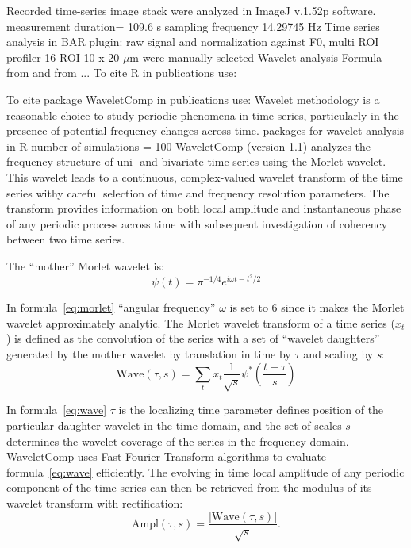 \documentclass{biophys-new}
\begin{document}
Recorded time-series image stack were analyzed in ImageJ v.1.52p software\cite{rueden2017imagej2}.
measurement duration= 109.6 s sampling frequency 14.29745 Hz
Time series analysis in BAR plugin: raw signal and
normalization against F0, multi ROI profiler
16 ROI 10 x 20 $\mu$m were manually selected
Wavelet analysis
Formula from \cite{grinsted2004application} and from \cite{kahraman2016multiple} ...
To cite R in publications use:  \cite{team2014r}

To cite package WaveletComp in publications use: \cite{rosch2016waveletcomp}
Wavelet methodology is a reasonable choice to study periodic phenomena in time series, particularly in
the presence of potential frequency changes across time.
packages for wavelet analysis in R
number of simulations = 100
WaveletComp (version 1.1) analyzes the frequency structure of uni- and bivariate time series using the Morlet wavelet.
This wavelet leads to a continuous, complex-valued wavelet transform of the time series withy careful selection of time and frequency resolution parameters. The transform provides information on both local amplitude and instantaneous phase of any periodic process across time with subsequent investigation of coherency between two time series.


The “mother” Morlet wavelet is:
\begin{equation}\label{eq:morlet}
\psi(t)=\pi^{-1/4}e^{i\omega t-{t^2}/2}
\end{equation}


In formula~\ref{eq:morlet} “angular frequency” $\omega$ is set to 6 since it makes the Morlet wavelet approximately analytic.
The Morlet wavelet transform of a time series (${x}_{t}$) is defined as the convolution of the series with a set of “wavelet daughters” generated by the mother wavelet by translation in time by $\tau$ and scaling by \textit{s}:
\begin{equation}\label{eq:wave}
\text{Wave}(\tau, s)=\sum_{t}x_{t}\frac{1}{\sqrt{s}}\psi^{\ast}\left(\frac{t-\tau}{s}\right)
\end{equation}

In formula~\ref{eq:wave} $\tau$ is the localizing time parameter defines position of the particular daughter wavelet in the time domain, and the set of scales $s$ determines the wavelet coverage of the series in the frequency domain.
WaveletComp uses Fast Fourier Transform algorithms to evaluate formula~\ref{eq:wave} efficiently.
The evolving in time local amplitude of any periodic component of the time series can then be retrieved from the modulus of its wavelet transform with rectification:
\begin{equation}\label{eq:amplitude}
\text{Ampl}(\tau, s)=\frac{|\text{Wave}(\tau, s)|}{\sqrt{s}}.
\end{equation}
\end{document}
